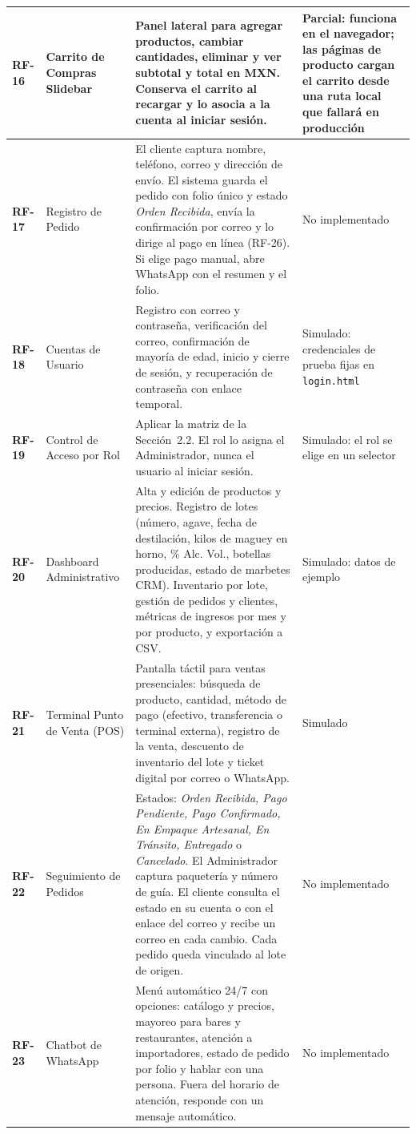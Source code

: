 \documentclass[11pt,letterpaper]{article}
\begin{document}
\begin{longtable}{@{} L{1.2cm} L{3.0cm} L{7.4cm} L{3.9cm} @{}}
\midrule
\textbf{RF-16} & Carrito de Compras Slidebar & Panel lateral para agregar productos, cambiar cantidades, eliminar y ver subtotal y total en MXN. Conserva el carrito al recargar y lo asocia a la cuenta al iniciar sesión. & Parcial: funciona en el navegador; las páginas de producto cargan el carrito desde una ruta local que fallará en producción \\
\midrule
\textbf{RF-17} & Registro de Pedido & El cliente captura nombre, teléfono, correo y dirección de envío. El sistema guarda el pedido con folio único y estado \textit{Orden Recibida}, envía la confirmación por correo y lo dirige al pago en línea (RF-26). Si elige pago manual, abre WhatsApp con el resumen y el folio. & No implementado \\
\midrule
\textbf{RF-18} & Cuentas de Usuario & Registro con correo y contraseña, verificación del correo, confirmación de mayoría de edad, inicio y cierre de sesión, y recuperación de contraseña con enlace temporal. & Simulado: credenciales de prueba fijas en \texttt{login.html} \\
\midrule
\textbf{RF-19} & Control de Acceso por Rol & Aplicar la matriz de la Sección~2.2. El rol lo asigna el Administrador, nunca el usuario al iniciar sesión. & Simulado: el rol se elige en un selector \\
\midrule
\textbf{RF-20} & Dashboard Administrativo & Alta y edición de productos y precios. Registro de lotes (número, agave, fecha de destilación, kilos de maguey en horno, \% Alc. Vol., botellas producidas, estado de marbetes CRM). Inventario por lote, gestión de pedidos y clientes, métricas de ingresos por mes y por producto, y exportación a CSV. & Simulado: datos de ejemplo \\
\midrule
\textbf{RF-21} & Terminal Punto de Venta (POS) & Pantalla táctil para ventas presenciales: búsqueda de producto, cantidad, método de pago (efectivo, transferencia o terminal externa), registro de la venta, descuento de inventario del lote y ticket digital por correo o WhatsApp. & Simulado \\
\midrule
\textbf{RF-22} & Seguimiento de Pedidos & Estados: \textit{Orden Recibida, Pago Pendiente, Pago Confirmado, En Empaque Artesanal, En Tránsito, Entregado} o \textit{Cancelado}. El Administrador captura paquetería y número de guía. El cliente consulta el estado en su cuenta o con el enlace del correo y recibe un correo en cada cambio. Cada pedido queda vinculado al lote de origen. & No implementado \\
\midrule
\textbf{RF-23} & Chatbot de WhatsApp & Menú automático 24/7 con opciones: catálogo y precios, mayoreo para bares y restaurantes, atención a importadores, estado de pedido por folio y hablar con una persona. Fuera del horario de atención, responde con un mensaje automático. & No implementado \\

\end{longtable}
\end{document}
